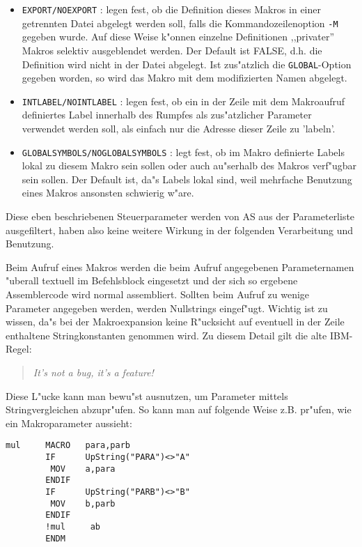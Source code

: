 \documentclass[12pt,a4paper,twoside]{report}
\newcommand{\ii}[1]{{\it #1}}
\newcommand{\tty}[1]{{\tt #1}}
\begin{document}
\begin{itemize}
{      benutzt wird.  Das lokal bekannte Originalmakro wird von ihr
      nicht beeinflu"st.}
\item{\tty{EXPORT/NOEXPORT} : legen fest, ob die Definition dieses
      Makros in einer getrennten Datei abgelegt werden soll, falls
      die Kommandozeilenoption \tty{-M} gegeben wurde.  Auf diese
      Weise k"onnen einzelne Definitionen ,,privater'' Makros selektiv
      ausgeblendet werden.  Der Default ist FALSE, d.h. die Definition
      wird nicht in der Datei abgelegt.  Ist zus"atzlich die
      \tty{GLOBAL}-Option gegeben worden, so wird das Makro mit dem
      modifizierten Namen abgelegt.}
\item{\tty{INTLABEL/NOINTLABEL} : legen fest, ob ein in der Zeile mit
      dem Makroaufruf definiertes Label innerhalb des Rumpfes als
      zus"atzlicher Parameter verwendet werden soll, als einfach
      nur die Adresse dieser Zeile zu 'labeln'.}
\item{\tty{GLOBALSYMBOLS/NOGLOBALSYMBOLS} : legt fest, ob im
      Makro definierte Labels lokal zu diesem Makro sein sollen
      oder auch au"serhalb des Makros verf"ugbar sein sollen.
      Der Default ist, da"s Labels lokal sind, weil mehrfache
      Benutzung eines Makros ansonsten schwierig w"are.}
\end{itemize}
Diese eben beschriebenen Steuerparameter werden von AS aus der
Parameterliste ausgefiltert, haben also keine weitere Wirkung in
der folgenden Verarbeitung und Benutzung.
\par
Beim Aufruf eines Makros werden die beim Aufruf angegebenen
Parameternamen "uberall textuell im Befehlsblock eingesetzt und der
sich so ergebene Assemblercode wird normal assembliert.  Sollten
beim Aufruf zu wenige Parameter angegeben werden, werden Nullstrings
eingef"ugt.  Wichtig ist zu wissen, da"s bei der Makroexpansion keine
R"ucksicht auf eventuell in der Zeile enthaltene Stringkonstanten
genommen wird.  Zu diesem Detail gilt die alte IBM-Regel:
\begin{quote}
\ii{It's not a bug, it's a feature!}
\end {quote}
Diese L"ucke kann man bewu"st ausnutzen, um Parameter mittels
Stringvergleichen abzupr"ufen.  So kann man auf folgende Weise
z.B. pr"ufen, wie ein Makroparameter aussieht:
\begin{verbatim}
mul     MACRO   para,parb
        IF      UpString("PARA")<>"A"
         MOV    a,para
        ENDIF
        IF      UpString("PARB")<>"B"
         MOV    b,parb
        ENDIF
        !mul     ab
        ENDM
\end{verbatim}
\end{document}
